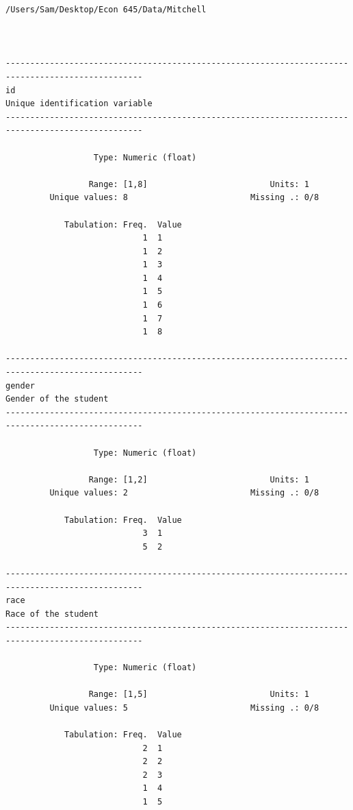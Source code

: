 \documentclass[
]{book}
\begin{document}
\begin{verbatim}
/Users/Sam/Desktop/Econ 645/Data/Mitchell



--------------------------------------------------------------------------------------------------
id                                                                  Unique identification variable
--------------------------------------------------------------------------------------------------

                  Type: Numeric (float)

                 Range: [1,8]                         Units: 1
         Unique values: 8                         Missing .: 0/8

            Tabulation: Freq.  Value
                            1  1
                            1  2
                            1  3
                            1  4
                            1  5
                            1  6
                            1  7
                            1  8

--------------------------------------------------------------------------------------------------
gender                                                                       Gender of the student
--------------------------------------------------------------------------------------------------

                  Type: Numeric (float)

                 Range: [1,2]                         Units: 1
         Unique values: 2                         Missing .: 0/8

            Tabulation: Freq.  Value
                            3  1
                            5  2

--------------------------------------------------------------------------------------------------
race                                                                           Race of the student
--------------------------------------------------------------------------------------------------

                  Type: Numeric (float)

                 Range: [1,5]                         Units: 1
         Unique values: 5                         Missing .: 0/8

            Tabulation: Freq.  Value
                            2  1
                            2  2
                            2  3
                            1  4
                            1  5


\end{verbatim}
\end{document}
